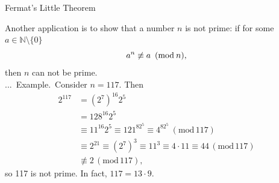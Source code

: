 \documentclass[smaller,hyperref={CJKbookmarks=true}]{beamer}
\newcommand{\N}{\mathbb{N}} \newcommand{\Z}{\mathbb{Z}} \newcommand{\Q}{\mathbb{Q}}
\newcounter{zhuo}[subsection]
\renewcommand{\thezhuo}{\thesection.\thesubsection.\arabic{zhuo}}
\newenvironment{EXAMPLE}{\stepcounter{zhuo}\alert{\!\thezhuo.~Example.\,}}{}
\begin{document}
\begin{frame}{Fermat's Little Theorem}
\begin{spacing}{1.1}
\newpage
Another application is to show that a number $n$ is not prime: if for some $a\in\N\setminus\{0\}$
\[a^n\not\equiv a\enskip(\text{mod}\:n),\]
then $n$ can not be prime.\\[5pt]
\begin{EXAMPLE}
Consider $n=117$. Then
\begin{equation*}
  \begin{split}
     2^{117} &=(2^7)^{16}2^5 \\
       &=128^{16}2^5 \\
       &\equiv11^{16}2^5\equiv 121^82^5\equiv4^82^5~(\text{mod}\,117) \\
       &\equiv2^{21}\equiv(2^7)^3\equiv11^3\equiv
       4\cdot11\equiv44\,(\text{mod}\,117) \\
       &\not\equiv2\,(\text{mod}\,117),
  \end{split}
\end{equation*}
so 117 is not prime. In fact, $117=13\cdot9$.
\end{EXAMPLE}
\end{spacing}
\end{frame}
\end{document}

